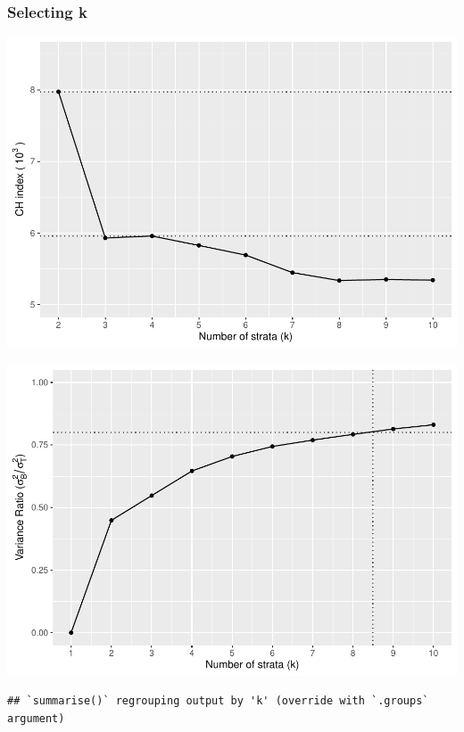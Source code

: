 \documentclass[
  english,
  man,floatsintext]{apa6}
\begin{document}
\hypertarget{selecting-k}{%
\subsubsection{Selecting k}\label{selecting-k}}

\includegraphics{5---Analysis_files/figure-latex/unnamed-chunk-3-1.pdf}

\includegraphics{5---Analysis_files/figure-latex/unnamed-chunk-4-1.pdf}

\begin{verbatim}
## `summarise()` regrouping output by 'k' (override with `.groups` argument)
\end{verbatim}
\end{document}
